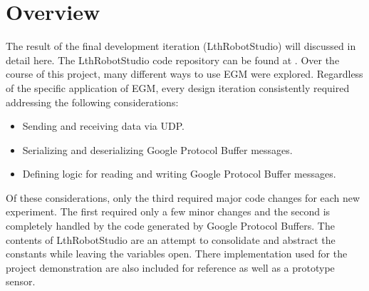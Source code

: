 \documentclass{cslthse-msc}
\begin{document}
\section{Overview}
\label{sec:Result:Overview}
The result of the final development iteration (LthRobotStudio) will discussed in detail here. The LthRobotStudio code repository can be found at \cite{Greg:LthRobotStudio}. Over the course of this project, many different ways to use EGM were explored. Regardless of the specific application of EGM, every design iteration consistently required addressing the following considerations:
\begin{itemize}
    \item Sending and receiving data via UDP.
    \item Serializing and deserializing Google Protocol Buffer messages.
    \item Defining logic for reading and writing Google Protocol Buffer messages.
\end{itemize}
Of these considerations, only the third required major code changes for each new experiment. The first required only a few minor changes and the second is completely handled by the code generated by Google Protocol Buffers. The contents of LthRobotStudio are an attempt to consolidate and abstract the constants while leaving the variables open. There implementation used for the project demonstration are also included for reference as well as a prototype sensor.
\end{document}
